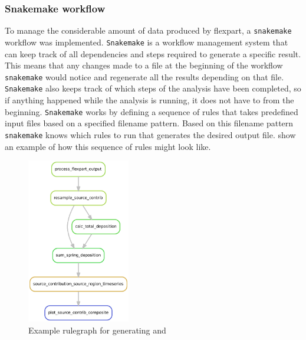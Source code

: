 \subsubsection{Snakemake workflow}
To manage the considerable amount of data produced by \acrshort{flexpart}, a \verb|snakemake| workflow was implemented.   
\verb|Snakemake| is a workflow management system \parencite{molder2021sustainable} that can keep track of all dependencies and steps required to generate a specific result.
This means that any changes made to a file at the beginning of the workflow \verb|snakemake| would notice and regenerate all the results depending on that file. 
\verb|Snakemake| also keeps track of which steps of the analysis have been completed, so if anything happened while the analysis is running, it does not have to from the beginning. 
\verb|Snakemake| works by defining a sequence of rules that takes predefined input files based on a specified filename pattern. 
Based on this filename pattern \verb|snakemake| knows which rules to run that generates the desired output file.  show an example of how this sequence of rules might look like.  
 \begin{figure}[htpb]
     \centering
     \includegraphics[width=0.4\textwidth]{texfiles/figs/rulegraph_eks.pdf}
     \caption{Example rulegraph for generating  and }
     \label{fig:rule_graph_eks}
 \end{figure}  

